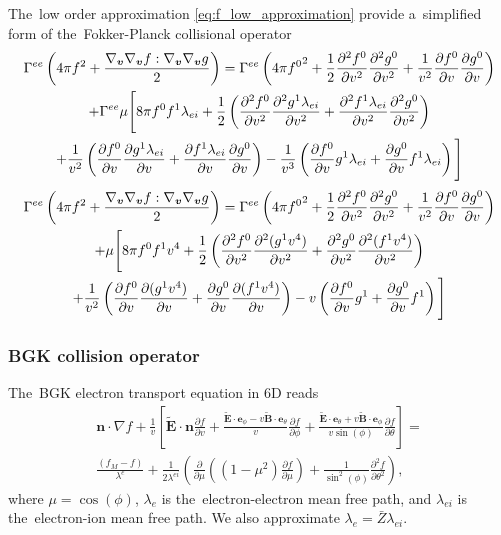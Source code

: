 \documentclass[preprint,12pt]{elsarticle}
\newcommand{\pdv}[2]{\frac{\partial{#1}}{\partial{#2}}}
\newcommand{\vect}[1]{\boldsymbol{#1}}
\newcommand{\mfpe}{\lambda_e}
\newcommand{\mfpei}{\lambda_{ei}}
\newcommand{\Zbar}{\bar{Z}}
\newcommand{\vmag}{v}
\newcommand{\vn}{\vect{n}}
\newcommand{\tE}{\vect{\tilde{E}}}
\newcommand{\tB}{\vect{\tilde{B}}}
\newcommand{\fM}{f_M}
\newcounter{bla}
\begin{document}
The~low order approximation \eqref{eq:f_low_approximation} provide a~simplified
form of the~Fokker-Planck collisional operator
\begin{multline}
  \Gamma^{ee} \left(4\pi f^2 
  + \frac{\gv\gv \ft : \gv\gv \gt}{2}\right) = 
  \Gamma^{ee}\left(4\pi{\ft^0}^2 + 
  \frac{1}{2}\frac{\partial^2 \ft^0}{\partial \vmag^2}
  \frac{\partial^2 \gt^0}{\partial \vmag^2}
  + \frac{1}{\vmag^2}\pdv{\ft^0}{\vmag}\pdv{\gt^0}{\vmag} \right)
  \\
  + \Gamma^{ee}\mu\Bigg[8\pi \ft^0 \ft^1\mfpei + 
  \frac{1}{2}\left(\frac{\partial^2 \ft^0}{\partial \vmag^2}
  \frac{\partial^2 \gt^1\mfpei}{\partial \vmag^2}
  + \frac{\partial^2 \ft^1\mfpei}{\partial \vmag^2}
  \frac{\partial^2 \gt^0}{\partial \vmag^2}\right) \\ 
  + \frac{1}{\vmag^2}\left(\pdv{\ft^0}{\vmag}
  \pdv{\gt^1\mfpei}{\vmag}
  + \pdv{\ft^1\mfpei}{\vmag}
  \pdv{\gt^0}{\vmag}\right)
  - \frac{1}{\vmag^3}\left(
  \pdv{\ft^0}{\vmag}\gt^1\mfpei 
  + \pdv{\gt^0}{\vmag}\ft^1\mfpei\right) \Bigg]
  \nonumber
\end{multline}
\begin{multline}
  \Gamma^{ee} \left(4\pi f^2 
  + \frac{\gv\gv \ft : \gv\gv \gt}{2}\right) = 
  \Gamma^{ee}\left(4\pi{\ft^0}^2 + 
  \frac{1}{2}\frac{\partial^2 \ft^0}{\partial \vmag^2}
  \frac{\partial^2 \gt^0}{\partial \vmag^2}
  + \frac{1}{\vmag^2}\pdv{\ft^0}{\vmag}\pdv{\gt^0}{\vmag} \right)
  \\
  + \mu\Bigg[8\pi \ft^0 \ft^1\vmag^4 + 
  \frac{1}{2}\left(\frac{\partial^2 \ft^0}{\partial \vmag^2}
  \frac{\partial^2 (\gt^1\vmag^4)}{\partial \vmag^2}
  + \frac{\partial^2 \gt^0}{\partial \vmag^2} 
  \frac{\partial^2 (\ft^1\vmag^4)}{\partial \vmag^2}
  \right) \\ 
  + \frac{1}{\vmag^2}\left(\pdv{\ft^0}{\vmag}
  \pdv{(\gt^1\vmag^4)}{\vmag}
  + \pdv{\gt^0}{\vmag}\pdv{(\ft^1\vmag^4)}{\vmag}\right)
  - \vmag\left(\pdv{\ft^0}{\vmag}\gt^1 
  + \pdv{\gt^0}{\vmag}\ft^1\right) \Bigg]
  \nonumber
\end{multline}

\subsubsection{BGK collision operator}\label{sec:BGK_cop}
The~BGK electron transport equation in 6D reads
\begin{multline}
  \vn\cdot\nabla f + \frac{1}{\vmag} \left[ \tE\cdot\vn \pdv{f}{\vmag} 
  + \frac{\tE\cdot\vect{e}_\phi 
  - \vmag\tB\cdot\vect{e}_\theta}{\vmag}\pdv{f}{\phi}
  + \frac{\tE\cdot\vect{e}_\theta + \vmag\tB\cdot\vect{e}_\phi}
  {\vmag\sin(\phi)}\pdv{f}{\theta} \right] 
  =\\
  \frac{\left(\fM - f\right)}{\lambda^e} 
  + \frac{1}{2 \lambda^{ei}} 
  \left(\pdv{}{\mu}\left((1 - \mu^2)\pdv{f}{\mu}\right)
  + \frac{1}{\sin^2(\phi)}\frac{\partial^2f}{\partial\theta^2} \right) ,
  \label{eq:BGK_spherical}
\end{multline}
where $\mu = \cos(\phi)$, $\mfpe$ is the~electron-electron mean free path, and
$\mfpei$ is the~electron-ion mean free path. We also approximate
$\mfpe = \Zbar \mfpei$.
\end{document}
